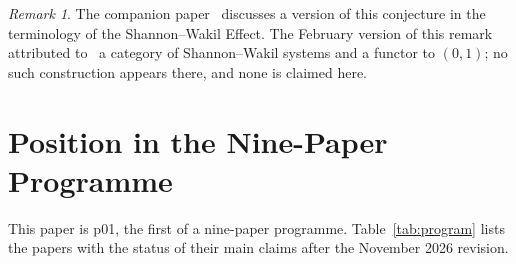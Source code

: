 \documentclass[12pt]{amsart}
\theoremstyle{plain}
\theoremstyle{definition}
\theoremstyle{remark}
\newtheorem{remark}[theorem]{Remark}
\begin{document}
\begin{remark}
The companion paper~\cite{WakilShannon} discusses a version of this conjecture
in the terminology of the Shannon--Wakil Effect. The February version of this
remark attributed to~\cite{WakilShannon} a category of Shannon--Wakil systems
and a functor to $(0,1)$; no such construction appears there, and none is
claimed here.
\end{remark}

\section{Position in the Nine-Paper Programme}
\label{sec:program}

This paper is p01, the first of a nine-paper programme.
Table~\ref{tab:program} lists the papers with the status of their main claims
after the November 2026 revision.
\end{document}
